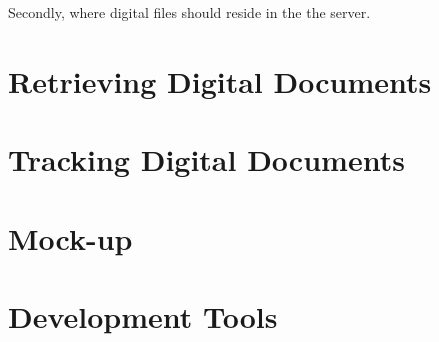 Secondly, where digital files should reside in the the server.


\section{Retrieving Digital Documents}

\section{Tracking Digital Documents}

\section{Mock-up}

\section{Development Tools}